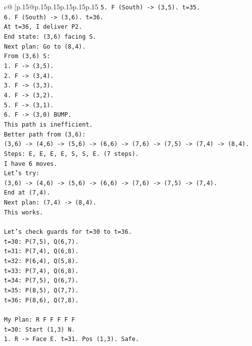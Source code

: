\documentclass{article}
\begin{document}
{\begin{supertabular}{c@{$\;$}|p{.15\linewidth}@{}p{.15\linewidth}p{.15\linewidth}p{.15\linewidth}p{.15\linewidth}p{.15\linewidth}}
{{{\texttt{5. F (South) {-}> (3,5). t=35.} \\
\texttt{6. F (South) {-}> (3,6). t=36.} \\
\texttt{At t=36, I deliver P2.} \\
\texttt{End state: (3,6) facing S.} \\
\texttt{Next plan: Go to (8,4).} \\
\texttt{From (3,6) S:} \\
\texttt{1. F {-}> (3,5).} \\
\texttt{2. F {-}> (3,4).} \\
\texttt{3. F {-}> (3,3).} \\
\texttt{4. F {-}> (3,2).} \\
\texttt{5. F {-}> (3,1).} \\
\texttt{6. F {-}> (3,0) BUMP.} \\
\texttt{This path is inefficient.} \\
\texttt{Better path from (3,6):} \\
\texttt{(3,6) {-}> (4,6) {-}> (5,6) {-}> (6,6) {-}> (7,6) {-}> (7,5) {-}> (7,4) {-}> (8,4).} \\
\texttt{Steps: E, E, E, E, S, S, E. (7 steps).} \\
\texttt{I have 6 moves.} \\
\texttt{Let's try:} \\
\texttt{(3,6) {-}> (4,6) {-}> (5,6) {-}> (6,6) {-}> (7,6) {-}> (7,5) {-}> (7,4).} \\
\texttt{End at (7,4).} \\
\texttt{Next plan: (7,4) {-}> (8,4).} \\
\texttt{This works.} \\
\\ 
\texttt{Let's check guards for t=30 to t=36.} \\
\texttt{t=30: P(7,5), Q(6,7).} \\
\texttt{t=31: P(7,4), Q(6,8).} \\
\texttt{t=32: P(6,4), Q(5,8).} \\
\texttt{t=33: P(7,4), Q(6,8).} \\
\texttt{t=34: P(7,5), Q(6,7).} \\
\texttt{t=35: P(8,5), Q(7,7).} \\
\texttt{t=36: P(8,6), Q(7,8).} \\
\\ 
\texttt{My Plan: R F F F F F} \\
\texttt{t=30: Start (1,3) N.} \\
\texttt{1. R {-}> Face E. t=31. Pos (1,3). Safe.} \\
}}}
\end{supertabular}}
\end{document}

